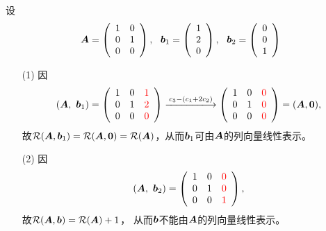 \begin{frame}
设$$\boldsymbol{A}=\left(
  \begin{array}{cc}
    1&0\\
    0&1\\
    0&0
  \end{array}
\right),~~
{\boldsymbol{b}}_1=\left(
    \begin{array}{cc}
      1\\
      2\\
      0
    \end{array}
  \right), ~~
{\boldsymbol{b}}_2=\left(
    \begin{array}{cc}
      0\\
      0\\
      1
    \end{array}
  \right)  
$$
\begin{itemize}
\item[(1)] 因
  $$
  (\MA,~\vb_1) = \left(
    \begin{array}{ccc}
      1&0&\red{1}\\
      0&1&\red{2}\\
      0&0&\red{0}
    \end{array}
  \right) \xlongrightarrow[]{c_3-(c_1+2c_2)}
  \left(
    \begin{array}{ccc}
      1&0&\red{0}\\
      0&1&\red{0}\\
      0&0&\red{0}
    \end{array}
  \right) = (\MA, \M0),
  $$
  故$\rank(\MA,\vb_1)=\rank(\MA,\M0)=\rank(\MA)$，从而${\boldsymbol{b}}_1$可由$\boldsymbol{A}$的列向量线性表示。\\[0.1in]  
\item[(2)] 因
  $$
  (\boldsymbol{A},~{\boldsymbol{b}}_2) = \left(
    \begin{array}{ccc}
      1&0&\textcolor{red}{0}\\
      0&1&\textcolor{red}{0}\\
      0&0&\textcolor{red}{1}
    \end{array}
  \right),
  $$
  故$\mathcal{R}(\boldsymbol{A},{\boldsymbol{b}})=\mathcal{R}(\boldsymbol{A})+1$，
  从而${\boldsymbol{b}}$不能由$\boldsymbol{A}$的列向量线性表示。  
\end{itemize}
\end{frame}

